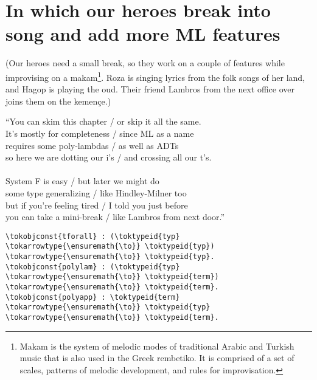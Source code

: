 \section{In which our heroes break into song and add more ML
features}\label{in-which-our-heroes-break-into-song-and-add-more-ml-features}

\begin{scenecomment}
(Our heroes need a small break, so they work on a couple of features while improvising on a makam\footnote{Makam is the system of melodic modes of traditional Arabic and Turkish music that is also used in the Greek rembetiko. It is comprised of a set of scales, patterns of melodic development, and rules for improvisation.}. Roza is singing lyrics from the folk songs of her land, and Hagop is playing the oud. Their friend Lambros from the next office over joins them on the kemen\c{c}e.)
\end{scenecomment}

\begin{versy}
``You can skim this chapter / or skip it all the same. \\
It's mostly for completeness / since ML as a name \\
requires some poly-lambdas / as well as ADTs \\
so here we are dotting our i's / and crossing all our t's. \\
\hspace{1em} \vspace{-0.5em} \\
System F is easy / but later we might do \\
some type generalizing / like Hindley-Milner too \\
but if you're feeling tired / I told you just before \\
you can take a mini-break / like Lambros from next door.''
\end{versy}

\begin{verbatim}
\tokobjconst{tforall} : (\toktypeid{typ} \tokarrowtype{\ensuremath{\to}} \toktypeid{typ}) \tokarrowtype{\ensuremath{\to}} \toktypeid{typ}.
\tokobjconst{polylam} : (\toktypeid{typ} \tokarrowtype{\ensuremath{\to}} \toktypeid{term}) \tokarrowtype{\ensuremath{\to}} \toktypeid{term}.
\tokobjconst{polyapp} : \toktypeid{term} \tokarrowtype{\ensuremath{\to}} \toktypeid{typ} \tokarrowtype{\ensuremath{\to}} \toktypeid{term}.
\end{verbatim}

\importantCodeblock{}

